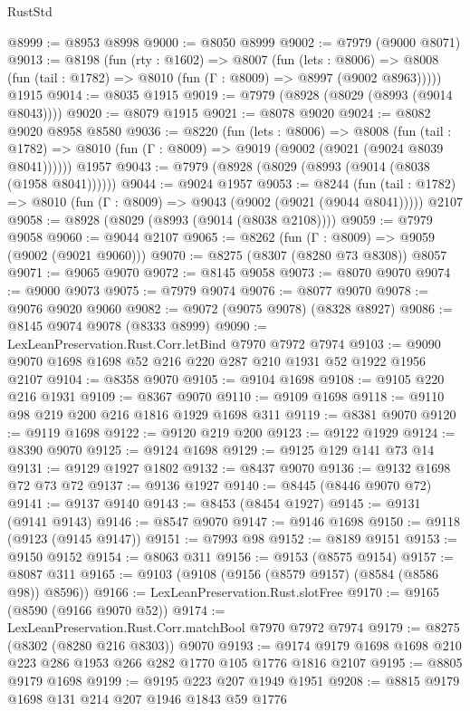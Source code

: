 \begin{lexlean}{RustStd}
\begin{coremodule}
@8999 := @8953 @8998
@9000 := @8050 @8999
@9002 := @7979 (@9000 @8071)
@9013 := @8198
    (fun (rty : @1602) =>
    @8007
      (fun (lets : @8006) =>
      @8008 (fun (tail : @1782) => @8010 (fun (Γ : @8009) => @8997 (@9002 @8963)))))
    @1915
@9014 := @8035 @1915
@9019 := @7979 (@8928 (@8029 (@8993 (@9014 @8043))))
@9020 := @8079 @1915
@9021 := @8078 @9020
@9024 := @8082 @9020 @8958 @8580
@9036 := @8220
    (fun (lets : @8006) =>
    @8008
      (fun (tail : @1782) => @8010 (fun (Γ : @8009) => @9019 (@9002 (@9021 (@9024 @8039 @8041))))))
    @1957
@9043 := @7979 (@8928 (@8029 (@8993 (@9014 (@8038 (@1958 @8041))))))
@9044 := @9024 @1957
@9053 := @8244
    (fun (tail : @1782) => @8010 (fun (Γ : @8009) => @9043 (@9002 (@9021 (@9044 @8041)))))
    @2107
@9058 := @8928 (@8029 (@8993 (@9014 (@8038 @2108))))
@9059 := @7979 @9058
@9060 := @9044 @2107
@9065 := @8262 (fun (Γ : @8009) => @9059 (@9002 (@9021 @9060)))
@9070 := @8275 (@8307 (@8280 @73 @8308)) @8057
@9071 := @9065 @9070
@9072 := @8145 @9058
@9073 := @8070 @9070
@9074 := @9000 @9073
@9075 := @7979 @9074
@9076 := @8077 @9070
@9078 := @9076 @9020 @9060
@9082 := @9072 (@9075 @9078) (@8328 @8927)
@9086 := @8145 @9074 @9078 (@8333 @8999)
@9090 := LexLeanPreservation.Rust.Corr.letBind @7970 @7972 @7974
@9103 := @9090 @9070 @1698 @1698 @52 @216 @220 @287 @210 @1931 @52 @1922 @1956 @2107
@9104 := @8358 @9070
@9105 := @9104 @1698
@9108 := @9105 @220 @216 @1931
@9109 := @8367 @9070
@9110 := @9109 @1698
@9118 := @9110 @98 @219 @200 @216 @1816 @1929 @1698 @311
@9119 := @8381 @9070
@9120 := @9119 @1698
@9122 := @9120 @219 @200
@9123 := @9122 @1929
@9124 := @8390 @9070
@9125 := @9124 @1698
@9129 := @9125 @129 @141 @73 @14
@9131 := @9129 @1927 @1802
@9132 := @8437 @9070
@9136 := @9132 @1698 @72 @73 @72
@9137 := @9136 @1927
@9140 := @8445 (@8446 @9070 @72)
@9141 := @9137 @9140
@9143 := @8453 (@8454 @1927)
@9145 := @9131 (@9141 @9143)
@9146 := @8547 @9070
@9147 := @9146 @1698
@9150 := @9118 (@9123 (@9145 @9147))
@9151 := @7993 @98
@9152 := @8189 @9151
@9153 := @9150 @9152
@9154 := @8063 @311
@9156 := @9153 (@8575 @9154)
@9157 := @8087 @311
@9165 := @9103 (@9108 (@9156 (@8579 @9157) (@8584 (@8586 @98)) @8596))
@9166 := LexLeanPreservation.Rust.slotFree
@9170 := @9165 (@8590 (@9166 @9070 @52))
@9174 := LexLeanPreservation.Rust.Corr.matchBool @7970 @7972 @7974
@9179 := @8275 (@8302 (@8280 @216 @8303)) @9070
@9193 := @9174 @9179 @1698 @1698 @210 @223 @286 @1953 @266 @282 @1770 @105 @1776 @1816 @2107
@9195 := @8805 @9179 @1698
@9199 := @9195 @223 @207 @1949 @1951
@9208 := @8815 @9179 @1698 @131 @214 @207 @1946 @1843 @59 @1776

\end{coremodule}
\end{lexlean}
